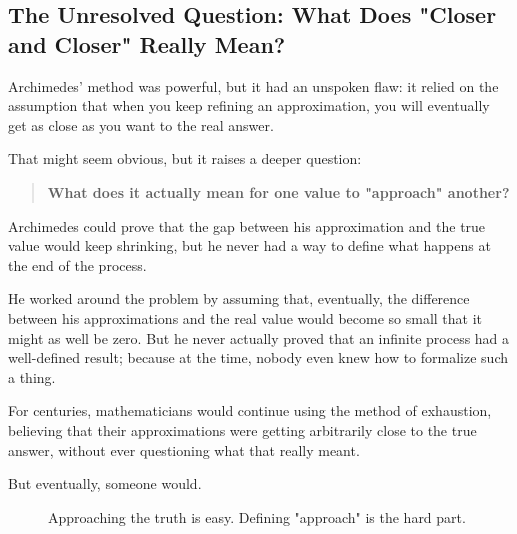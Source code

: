 \subsection{The Unresolved Question: What Does "Closer and Closer" Really Mean?}  

Archimedes’ method was powerful, but it had an unspoken flaw: it relied on the assumption that when you keep refining an approximation, you will eventually get as close as you want to the real answer.  

That might seem obvious, but it raises a deeper question:  

\begin{quote}
    \textbf{What does it actually mean for one value to "approach" another?}
\end{quote}

Archimedes could prove that the gap between his approximation and the true value would keep shrinking, but he never had a way to define what happens at the end of the process.  

He worked around the problem by assuming that, eventually, the difference between his approximations and the real value would become so small that it might as well be zero. But he never actually proved that an infinite process had a well-defined result; because at the time, nobody even knew how to formalize such a thing.  

For centuries, mathematicians would continue using the method of exhaustion, believing that their approximations were getting arbitrarily close to the true answer, without ever questioning what that really meant.  

But eventually, someone would.  

\begin{figure}[H]
\centering
{}
\caption{Approaching the truth is easy. Defining "approach" is the hard part.}
\end{figure}



